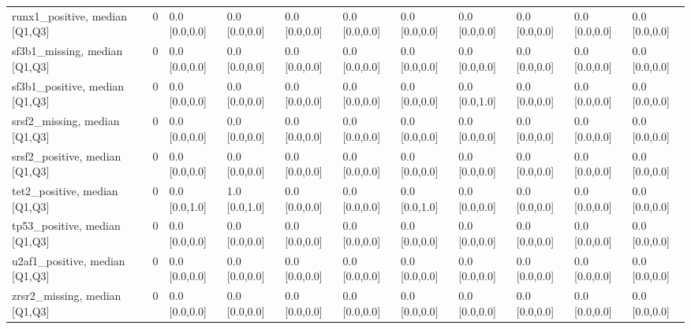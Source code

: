 \begin{tabular}{llllllllllll}
runx1\_positive, median [Q1,Q3] &    &                    0 &       0.0 [0.0,0.0] &      0.0 [0.0,0.0] &        0.0 [0.0,0.0] &       0.0 [0.0,0.0] &     0.0 [0.0,0.0] &     0.0 [0.0,0.0] &     0.0 [0.0,0.0] &       0.0 [0.0,0.0] &        0.0 [0.0,0.0] \\
sf3b1\_missing, median [Q1,Q3] &    &                    0 &       0.0 [0.0,0.0] &      0.0 [0.0,0.0] &        0.0 [0.0,0.0] &       0.0 [0.0,0.0] &     0.0 [0.0,0.0] &     0.0 [0.0,0.0] &     0.0 [0.0,0.0] &       0.0 [0.0,0.0] &        0.0 [0.0,0.0] \\
sf3b1\_positive, median [Q1,Q3] &    &                    0 &       0.0 [0.0,0.0] &      0.0 [0.0,0.0] &        0.0 [0.0,0.0] &       0.0 [0.0,0.0] &     0.0 [0.0,0.0] &     0.0 [0.0,1.0] &     0.0 [0.0,0.0] &       0.0 [0.0,0.0] &        0.0 [0.0,0.0] \\
srsf2\_missing, median [Q1,Q3] &    &                    0 &       0.0 [0.0,0.0] &      0.0 [0.0,0.0] &        0.0 [0.0,0.0] &       0.0 [0.0,0.0] &     0.0 [0.0,0.0] &     0.0 [0.0,0.0] &     0.0 [0.0,0.0] &       0.0 [0.0,0.0] &        0.0 [0.0,0.0] \\
srsf2\_positive, median [Q1,Q3] &    &                    0 &       0.0 [0.0,0.0] &      0.0 [0.0,0.0] &        0.0 [0.0,0.0] &       0.0 [0.0,0.0] &     0.0 [0.0,0.0] &     0.0 [0.0,0.0] &     0.0 [0.0,0.0] &       0.0 [0.0,0.0] &        0.0 [0.0,0.0] \\
tet2\_positive, median [Q1,Q3] &    &                    0 &       0.0 [0.0,1.0] &      1.0 [0.0,1.0] &        0.0 [0.0,0.0] &       0.0 [0.0,0.0] &     0.0 [0.0,1.0] &     0.0 [0.0,0.0] &     0.0 [0.0,0.0] &       0.0 [0.0,0.0] &        0.0 [0.0,0.0] \\
tp53\_positive, median [Q1,Q3] &    &                    0 &       0.0 [0.0,0.0] &      0.0 [0.0,0.0] &        0.0 [0.0,0.0] &       0.0 [0.0,0.0] &     0.0 [0.0,0.0] &     0.0 [0.0,0.0] &     0.0 [0.0,0.0] &       0.0 [0.0,0.0] &        0.0 [0.0,0.0] \\
u2af1\_positive, median [Q1,Q3] &    &                    0 &       0.0 [0.0,0.0] &      0.0 [0.0,0.0] &        0.0 [0.0,0.0] &       0.0 [0.0,0.0] &     0.0 [0.0,0.0] &     0.0 [0.0,0.0] &     0.0 [0.0,0.0] &       0.0 [0.0,0.0] &        0.0 [0.0,0.0] \\
zrsr2\_missing, median [Q1,Q3] &    &                    0 &       0.0 [0.0,0.0] &      0.0 [0.0,0.0] &        0.0 [0.0,0.0] &       0.0 [0.0,0.0] &     0.0 [0.0,0.0] &     0.0 [0.0,0.0] &     0.0 [0.0,0.0] &       0.0 [0.0,0.0] &        0.0 [0.0,0.0] \\

\end{tabular}
